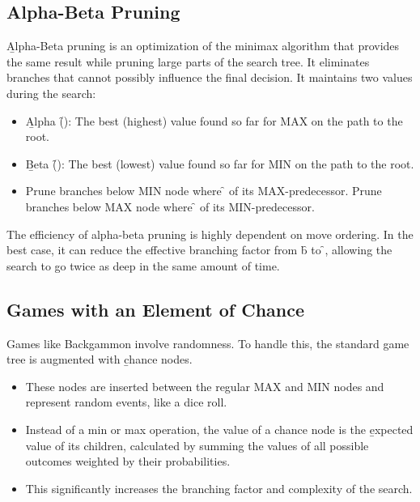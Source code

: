 \subsection{Alpha-Beta Pruning}
\b{Alpha-Beta pruning} is an optimization of the minimax algorithm that provides the same result while pruning large parts of the search tree. It eliminates branches that cannot possibly influence the final decision. It maintains two values during the search:
\begin{itemize}
    \item \b{Alpha (\f{\alpha}):} The best (highest) value found so far for MAX on the path to the root.
    \item \b{Beta (\f{\beta}):} The best (lowest) value found so far for MIN on the path to the root.
    \item Prune branches below MIN node where \f{\beta \le \alpha} of its MAX-predecessor. Prune branches below MAX node where \f{\alpha \ge \beta} of its MIN-predecessor.
\end{itemize}
The efficiency of alpha-beta pruning is highly dependent on move ordering. In the best case, it can reduce the effective branching factor from \f{b} to \f{}, allowing the search to go twice as deep in the same amount of time.

\subsection{Games with an Element of Chance}
Games like Backgammon involve randomness. To handle this, the standard game tree is augmented with \b{chance nodes}.
\begin{itemize}
    \item These nodes are inserted between the regular MAX and MIN nodes and represent random events, like a dice roll.
    \item Instead of a min or max operation, the value of a chance node is the \b{expected value} of its children, calculated by summing the values of all possible outcomes weighted by their probabilities.
    \item This significantly increases the branching factor and complexity of the search.
\end{itemize}
\newpage